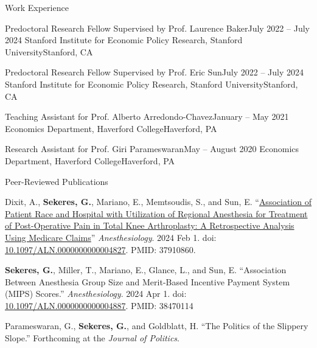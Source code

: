 \documentclass{resume}
\begin{document}
\begin{rSection}{Work Experience}

\begin{rSubsection}{Predoctoral Research Fellow Supervised by Prof. Laurence Baker}{July 2022 -- July 2024}{  Stanford Institute for Economic Policy Research, Stanford University}{Stanford, CA}
\item[]
\vspace{-1cm}
\end{rSubsection}
\begin{rSubsection}{Predoctoral Research Fellow Supervised by Prof. Eric Sun}{July 2022 -- July 2024}{  Stanford Institute for Economic Policy Research, Stanford University}{Stanford, CA}
\item[]
\vspace{-1cm}
\end{rSubsection}

\begin{rSubsection}{Teaching Assistant for Prof. Alberto Arredondo-Chavez}{January -- May 2021}{  Economics Department, Haverford College}{Haverford, PA}
\item[]
\vspace{-1cm}
\end{rSubsection}

\begin{rSubsection}{Research Assistant for Prof. Giri Parameswaran}{May -- August 2020}{  Economics Department, Haverford College}{Haverford, PA}
\item[]
\vspace{-1cm}
\end{rSubsection}
 \end{rSection}
\begin{rSection}{Peer-Reviewed Publications}
    \item Dixit, A., \textbf{Sekeres, G.}, Mariano, E., Memtsoudis, S., and Sun, E. ``\href{https://pubmed.ncbi.nlm.nih.gov/37910860/}{Association of Patient Race and Hospital with Utilization of Regional Anesthesia for Treatment of Post-Operative Pain in Total Knee Arthroplasty: A Retrospective Analysis Using Medicare Claims}'' \emph{Anesthesiology}. 2024 Feb 1. doi: \href{https://doi.org/10.1097/aln.0000000000004827}{10.1097/ALN.0000000000004827}. PMID: 37910860.

    \item \textbf{Sekeres, G.}, Miller, T., Mariano, E., Glance, L., and Sun, E. ``Association Between Anesthesia Group Size and Merit-Based Incentive Payment System (MIPS) Scores.'' \emph{Anesthesiology}. 2024 Apr 1. doi: \href{https://doi.org/10.1097/ALN.0000000000004887}{10.1097/ALN.0000000000004887}. PMID: 38470114

    \item Parameswaran, G., \textbf{Sekeres, G.}, and Goldblatt, H. ``The Politics of the Slippery Slope.'' Forthcoming at the \emph{Journal of Politics}.
\end{rSection}
\end{document}
